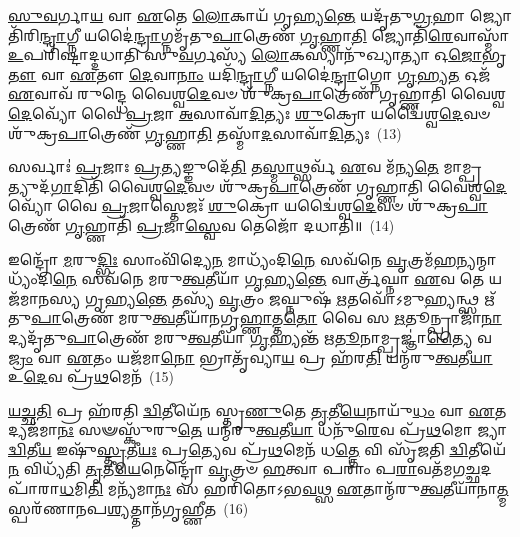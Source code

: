 {\anuvakamend[{𑌕𑍋 𑌜𑍀᳴𑌵\-\ul{𑌨𑍍𑌤𑌿} 𑌦𑍍𑌵𑌿𑌃 \ul{𑌸𑍍𑌯𑍁}\-𑌶𑍍𑌚𑌤𑍁᳴𑌸𑍍𑌤𑍍𑌰𑌿𑍞𑌶𑌚𑍍𑌚}]}%

\-\ul{𑌸𑍁}\-\-\ul{𑌵}\-𑌰𑍍𑌗𑌾\-\ul{𑌯} 𑌵𑌾 \ul{𑌏}\-𑌤𑍇 \ul{𑌲𑍋}\-𑌕𑌾𑌯᳴ 𑌗𑍃𑌹𑍍𑌯\-\ul{𑌨𑍍𑌤𑍇} 𑌯𑌦𑍃᳴𑌤𑍁\-\ul{𑌗𑍍𑌰}\-𑌹𑌾 𑌜𑍍𑌯𑍋𑌤𑌿᳴𑌰𑌿\-\ul{𑌨𑍍𑌦𑍍𑌰𑌾}\-𑌗𑍍𑌨𑍀 𑌯𑌦𑍈॑\-\ul{𑌨𑍍𑌦𑍍𑌰𑌾}\-𑌗𑍍𑌨𑌮𑍃᳴𑌤𑍁\-\ul{𑌪𑌾}\-𑌤𑍍𑌰𑍇𑌣᳴ \ul{𑌗𑍃}\-𑌹𑍍𑌣𑌾\-\ul{𑌤𑌿} 𑌜𑍍𑌯𑍋𑌤𑌿᳴\-\ul{𑌰𑍇}\-𑌵𑌾𑌸𑍍𑌮𑌾᳴ \ul{𑌉}\-𑌪𑌰𑌿᳴𑌷𑍍𑌟𑌾𑌦𑍍𑌦𑌧𑌾𑌤𑌿 𑌸𑍁\-\ul{𑌵}\-𑌰𑍍𑌗𑌸𑍍𑌯᳴ \ul{𑌲𑍋}\-𑌕𑌸𑍍𑌯𑌾𑌨𑍁᳴𑌖𑍍𑌯𑌾𑌤𑍍𑌯𑌾 𑌓\-\ul{𑌜𑍋}\-𑌭𑍃\-\ul{𑌤𑍗} 𑌵𑌾 \ul{𑌏}\-𑌤𑍗 \ul{𑌦𑍇}\-𑌵𑌾\-\ul{𑌨𑌾𑌂} 𑌯𑌦𑌿᳴\-\ul{𑌨𑍍𑌦𑍍𑌰𑌾}\-𑌗𑍍𑌨𑍀 𑌯𑌦𑍈॑\-\ul{𑌨𑍍𑌦𑍍𑌰𑌾}\-𑌗𑍍𑌨𑍋 \ul{𑌗𑍃}\-𑌹𑍍𑌯\-\ul{𑌤} 𑌓𑌜᳴ \ul{𑌏}\-𑌵𑌾𑌵᳴ 𑌰𑍁𑌨𑍍𑌦𑍍𑌧𑍇 𑌵𑍈𑌶𑍍𑌵\-\ul{𑌦𑍇}\-𑌵𑍞 𑌶𑍁᳴𑌕𑍍𑌰\-\ul{𑌪𑌾}\-𑌤𑍍𑌰𑍇𑌣᳴ 𑌗𑍃𑌹𑍍𑌣𑌾𑌤𑌿 𑌵𑍈𑌶𑍍𑌵\-\ul{𑌦𑍇}\-𑌵𑍍𑌯𑍋᳴ 𑌵𑍈 \ul{𑌪𑍍𑌰}\-𑌜𑌾 \ul{𑌅}\-𑌸𑌾𑌵𑌾᳴\-\ul{𑌦𑌿}\-𑌤𑍍𑌯𑌃 \ul{𑌶𑍁}\-𑌕𑍍𑌰𑍋 𑌯𑌦𑍍𑌵𑍈॑𑌶𑍍𑌵\-\ul{𑌦𑍇}\-𑌵𑍞 𑌶𑍁᳴𑌕𑍍𑌰\-\ul{𑌪𑌾}\-𑌤𑍍𑌰𑍇𑌣᳴ \ul{𑌗𑍃}\-𑌹𑍍𑌣𑌾\-\ul{𑌤𑌿} 𑌤𑌸𑍍𑌮𑌾᳴\-\ul{𑌦}\-𑌸𑌾𑌵𑌾᳴\-\ul{𑌦𑌿}\-𑌤𑍍𑌯𑌃~(13)

𑌸𑌰𑍍𑌵𑌾𑌃॑ \ul{𑌪𑍍𑌰}\-𑌜𑌾𑌃 \ul{𑌪𑍍𑌰}\-𑌤𑍍𑌯𑌙𑍍𑌙𑍁𑌦𑍇᳴\-\ul{𑌤𑌿} 𑌤\-\ul{𑌸𑍍𑌮𑌾}\-𑌥𑍍𑌸𑌰𑍍𑌵᳴ \ul{𑌏}\-𑌵 𑌮᳴𑌨𑍍𑌯\-\ul{𑌤𑍇} 𑌮𑌾𑌮𑍍𑌪𑍍𑌰𑌤𑍍𑌯𑍁𑌦᳴\-\ul{𑌗𑌾}\-𑌦𑌿𑌤𑌿᳴ 𑌵𑍈𑌶𑍍𑌵\-\ul{𑌦𑍇}\-𑌵𑍞 𑌶𑍁᳴𑌕𑍍𑌰\-\ul{𑌪𑌾}\-𑌤𑍍𑌰𑍇𑌣᳴ 𑌗𑍃𑌹𑍍𑌣𑌾𑌤𑌿 𑌵𑍈𑌶𑍍𑌵\-\ul{𑌦𑍇}\-𑌵𑍍𑌯𑍋᳴ 𑌵𑍈 \ul{𑌪𑍍𑌰}\-𑌜𑌾𑌸𑍍𑌤𑍇𑌜𑌃᳴ \ul{𑌶𑍁}\-𑌕𑍍𑌰𑍋 𑌯𑌦𑍍𑌵𑍈॑𑌶𑍍𑌵\-\ul{𑌦𑍇}\-𑌵𑍞 𑌶𑍁᳴𑌕𑍍𑌰\-\ul{𑌪𑌾}\-𑌤𑍍𑌰𑍇𑌣᳴ \ul{𑌗𑍃}\-𑌹𑍍𑌣𑌾𑌤𑌿᳴ \ul{𑌪𑍍𑌰}\-𑌜𑌾\-\ul{𑌸𑍍𑌵𑍇}\-𑌵 𑌤𑍇𑌜𑍋᳴ 𑌦𑌧𑌾𑌤𑌿॥~(14)

{\anuvakamend[{𑌤𑌸𑍍𑌮𑌾᳴\-\ul{𑌦}\-𑌸𑌾𑌵𑌾᳴\-\ul{𑌦𑌿}\-𑌤𑍍𑌯\-\ul{𑌸𑍍𑌤𑍍𑌰𑌿}\-\-\ul{𑍞}\-𑌶𑌚𑍍𑌚᳴}]}%

𑌇𑌨𑍍𑌦𑍍𑌰𑍋᳴ \ul{𑌮}\-𑌰𑍁\-\ul{𑌦𑍍𑌭𑌿𑌃} 𑌸𑌾𑌂𑌵𑌿᳴𑌦𑍍𑌯𑍇\-\ul{𑌨} 𑌮𑌾𑌧𑍍𑌯𑌂᳴𑌦𑌿\-\ul{𑌨𑍇} 𑌸𑌵᳴𑌨𑍇 \ul{𑌵𑍃}\-𑌤𑍍𑌰𑌮᳴\-\ul{𑌹}\-\-\ul{𑌨𑍍}\-𑌯𑌨𑍍𑌮𑌾𑌧𑍍𑌯𑌂᳴𑌦𑌿\-\ul{𑌨𑍇} 𑌸𑌵᳴𑌨𑍇 𑌮𑌰𑍁\-\ul{𑌤𑍍𑌵}\-𑌤𑍀𑌯𑌾᳴ \ul{𑌗𑍃}\-𑌹𑍍𑌯\-\ul{𑌨𑍍𑌤𑍇} 𑌵𑌾𑌰𑍍𑌤𑍍𑌰᳴𑌘𑍍𑌨𑌾 \ul{𑌏}\-𑌵 𑌤𑍇 𑌯𑌜᳴𑌮𑌾𑌨𑌸𑍍𑌯 𑌗𑍃𑌹𑍍𑌯\-\ul{𑌨𑍍𑌤𑍇} 𑌤𑌸𑍍𑌯᳴ \ul{𑌵𑍃}\-𑌤𑍍𑌰𑌂 \ul{𑌜}\-𑌘𑍍𑌨𑍁𑌷᳴ \ul{𑌋}\-𑌤𑌵𑍋᳴\-𑌽𑌮𑍁\-\ul{𑌹𑍍𑌯}\-𑌨𑍍𑌥𑍍𑌸 𑌋᳴𑌤𑍁\-\ul{𑌪𑌾}\-𑌤𑍍𑌰𑍇𑌣᳴ 𑌮𑌰𑍁\-\ul{𑌤𑍍𑌵}\-𑌤𑍀𑌯𑌾᳴𑌨𑌗𑍃\-\ul{𑌹𑍍𑌣𑌾}\-𑌤𑍍𑌤\-\ul{𑌤𑍋} 𑌵𑍈 𑌸 \ul{𑌋}\-𑌤𑍂𑌨𑍍𑌪𑍍𑌰𑌾𑌜𑌾᳴\-\ul{𑌨𑌾}\-𑌦𑍍𑌯𑌦𑍃᳴𑌤𑍁\-\ul{𑌪𑌾}\-𑌤𑍍𑌰𑍇𑌣᳴ 𑌮𑌰𑍁\-\ul{𑌤𑍍𑌵}\-𑌤𑍀𑌯𑌾᳴ \ul{𑌗𑍃}\-𑌹𑍍𑌯𑌨𑍍𑌤᳴ 𑌋\-\ul{𑌤𑍂}\-𑌨𑌾𑌮𑍍𑌪𑍍𑌰𑌜𑍍𑌞𑌾॑\-\ul{𑌤𑍍𑌯𑍈} 𑌵\-\ul{𑌜𑍍𑌰𑌂} 𑌵𑌾 \ul{𑌏}\-𑌤𑌂 𑌯𑌜᳴𑌮𑌾\-\ul{𑌨𑍋} 𑌭𑍍𑌰𑌾𑌤𑍃᳴𑌵𑍍𑌯𑌾\-\ul{𑌯} 𑌪𑍍𑌰 𑌹᳴𑌰\-\ul{𑌤𑌿} 𑌯𑌨𑍍𑌮᳴𑌰𑍁\-\ul{𑌤𑍍𑌵}\-𑌤𑍀\-\ul{𑌯𑌾} 𑌉\-\ul{𑌦𑍇}\-𑌵 𑌪𑍍𑌰᳴\-\ul{𑌥}\-𑌮𑍇𑌨᳴~(15)

\-\ul{𑌯}\-\-\ul{𑌚𑍍𑌛}\-\-\ul{𑌤𑌿} 𑌪𑍍𑌰 𑌹᳴𑌰𑌤𑌿 \ul{𑌦𑍍𑌵𑌿}\-𑌤𑍀𑌯𑍇᳴𑌨 𑌸𑍍𑌤𑍃\-\ul{𑌣𑍁}\-𑌤𑍇 \ul{𑌤𑍃}\-𑌤𑍀\-\ul{𑌯𑍇}\-𑌨𑌾𑌯𑍁᳴\-\ul{𑌧𑌂} 𑌵𑌾 \ul{𑌏}\-𑌤𑌦𑍍𑌯𑌜᳴𑌮𑌾\-\ul{𑌨𑌃} 𑌸𑍟𑌸𑍍𑌕𑍁᳴𑌰𑍁\-\ul{𑌤𑍇} 𑌯𑌨𑍍𑌮᳴𑌰𑍁\-\ul{𑌤𑍍𑌵}\-𑌤𑍀\-\ul{𑌯𑌾} 𑌧𑌨𑍁᳴\-\ul{𑌰𑍇}\-𑌵 𑌪𑍍𑌰᳴\-\ul{𑌥}\-𑌮𑍋 𑌜𑍍𑌯𑌾 \ul{𑌦𑍍𑌵𑌿}\-𑌤𑍀\-\ul{𑌯} 𑌇𑌷𑍁᳴\-\ul{𑌸𑍍𑌤𑍃}\-𑌤𑍀\-\ul{𑌯𑌃} 𑌪𑍍𑌰\-\ul{𑌤𑍍𑌯𑍇}\-𑌵 𑌪𑍍𑌰᳴\-\ul{𑌥}\-𑌮𑍇𑌨᳴ 𑌧\-\ul{𑌤𑍍𑌤𑍇} 𑌵𑌿 𑌸𑍃᳴𑌜𑌤𑌿 \ul{𑌦𑍍𑌵𑌿}\-𑌤𑍀𑌯𑍇᳴\-\ul{𑌨} 𑌵𑌿𑌧𑍍𑌯᳴𑌤𑌿 \ul{𑌤𑍃}\-𑌤𑍀\-\ul{𑌯𑍇}\-𑌨𑍇𑌨𑍍𑌦𑍍𑌰𑍋᳴ \ul{𑌵𑍃}\-𑌤𑍍𑌰𑍞 \ul{𑌹}\-𑌤𑍍𑌵𑌾 𑌪𑌰𑌾𑌂॑ 𑌪\-\ul{𑌰𑌾}\-𑌵𑌤᳴𑌮𑌗\-\ul{𑌚𑍍𑌛}\-𑌦𑌪𑌾᳴𑌰𑌾\-\ul{𑌧}\-𑌮𑌿\-\ul{𑌤𑌿} 𑌮𑌨𑍍𑌯᳴𑌮𑌾\-\ul{𑌨𑌃} 𑌸 𑌹𑌰𑌿᳴𑌤𑍋\-𑌽𑌭\-\ul{𑌵}\-𑌥𑍍𑌸 \ul{𑌏}\-𑌤𑌾𑌨𑍍𑌮᳴𑌰𑍁\-\ul{𑌤𑍍𑌵}\-𑌤𑍀𑌯𑌾᳴𑌨𑌾\-\ul{𑌤𑍍𑌮}\-𑌸𑍍𑌪𑌰᳴𑌣𑌾𑌨𑌪\-\ul{𑌶𑍍𑌯}\-𑌤𑍍𑌤𑌾𑌨᳴𑌗𑍃𑌹𑍍𑌣𑍀𑌤~(16)

